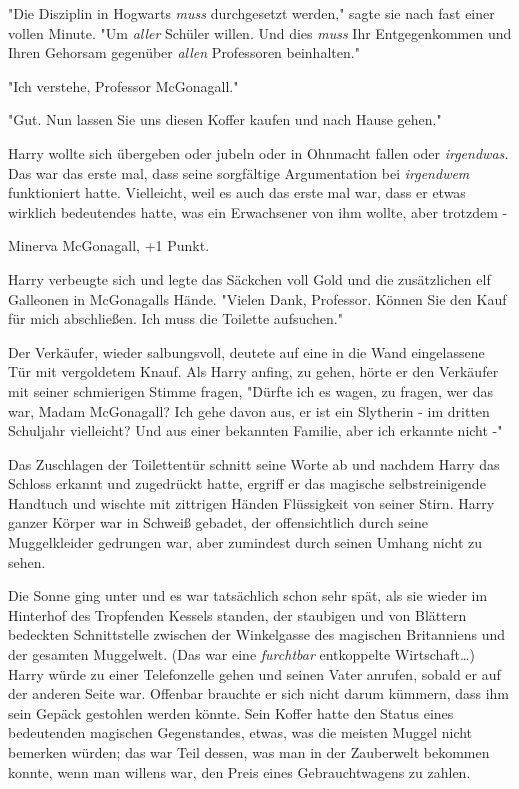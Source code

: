 {"Die Disziplin in Hogwarts \emph{muss} durchgesetzt werden," sagte sie nach fast einer vollen Minute. "Um \emph{aller} Schüler willen. Und dies \emph{muss} Ihr Entgegenkommen und Ihren Gehorsam gegenüber \emph{allen} Professoren beinhalten."

"Ich verstehe, Professor McGonagall."

"Gut. Nun lassen Sie uns diesen Koffer kaufen und nach Hause gehen."

Harry wollte sich übergeben oder jubeln oder in Ohnmacht fallen oder \emph{irgendwas.} Das war das erste mal, dass seine sorgfältige Argumentation bei \emph{irgendwem} funktioniert hatte. Vielleicht, weil es auch das erste mal war, dass er etwas wirklich bedeutendes hatte, was ein Erwachsener von ihm wollte, aber trotzdem -

Minerva McGonagall, +1 Punkt.

Harry verbeugte sich und legte das Säckchen voll Gold und die zusätzlichen elf Galleonen in McGonagalls Hände. "Vielen Dank, Professor. Können Sie den Kauf für mich abschließen. Ich muss die Toilette aufsuchen."

Der Verkäufer, wieder salbungsvoll, deutete auf eine in die Wand eingelassene Tür mit vergoldetem Knauf. Als Harry anfing, zu gehen, hörte er den Verkäufer mit seiner schmierigen Stimme fragen, "Dürfte ich es wagen, zu fragen, wer das war, Madam McGonagall? Ich gehe davon aus, er ist ein Slytherin - im dritten Schuljahr vielleicht? Und aus einer bekannten Familie, aber ich erkannte nicht -"

Das Zuschlagen der Toilettentür schnitt seine Worte ab und nachdem Harry das Schloss erkannt und zugedrückt hatte, ergriff er das magische selbstreinigende Handtuch und wischte mit zittrigen Händen Flüssigkeit von seiner Stirn. Harry ganzer Körper war in Schweiß gebadet, der offensichtlich durch seine Muggelkleider gedrungen war, aber zumindest durch seinen Umhang nicht zu sehen.

Die Sonne ging unter und es war tatsächlich schon sehr spät, als sie wieder im Hinterhof des Tropfenden Kessels standen, der staubigen und von Blättern bedeckten Schnittstelle zwischen der Winkelgasse des magischen Britanniens und der gesamten Muggelwelt. (Das war eine \emph{furchtbar} entkoppelte Wirtschaft…) Harry würde zu einer Telefonzelle gehen und seinen Vater anrufen, sobald er auf der anderen Seite war. Offenbar brauchte er sich nicht darum kümmern, dass ihm sein Gepäck gestohlen werden könnte. Sein Koffer hatte den Status eines bedeutenden magischen Gegenstandes, etwas, was die meisten Muggel nicht bemerken würden; das war Teil dessen, was man in der Zauberwelt bekommen konnte, wenn man willens war, den Preis eines Gebrauchtwagens zu zahlen.

}
